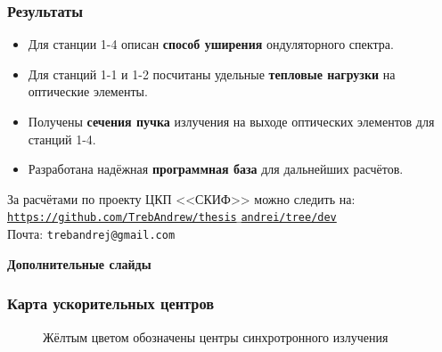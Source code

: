 \documentclass[14pt, hyperref = {colorlinks},xcolor=table ]{beamer}
\begin{document}
\small
\begin{frame}
\frametitle{Результаты}\label{t1}
\begin{center}
	\begin{itemize}
		\item Для станции 1-4 описан \textbf{способ уширения} ондуляторного спектра.
		\item Для станций 1-1 и 1-2 посчитаны удельные \textbf{тепловые нагрузки} на оптические элементы.
		\item Получены \textbf{сечения пучка} излучения на выходе оптических элементов для станций 1-4.
		\item Разработана надёжная \textbf{программная база} для дальнейших расчётов.		
	\end{itemize}
\end{center}
За расчётами по проекту ЦКП <<СКИФ>> можно следить на:\\
\href{https://github.com/TrebAndrew/thesis_andrei/tree/dev}{\texttt{https://github.com/TrebAndrew/thesis$\_$andrei/tree/dev}}\\
\vspace{5pt}
Почта: \texttt{trebandrej@gmail.com}\\
\end{frame}

\maketitle


\begin{frame}
\begin{center}
	\textbf{Дополнительные слайды}
\end{center}
\end{frame}

\small
\begin{frame}\label{r3}
\frametitle{Карта ускорительных центров}
\vspace{-20pt}
\begin{figure}[h]
	\raggedright\tiny{Жёлтым цветом обозначены центры синхротронного излучения}
\end{figure}
\end{frame}
\end{document}
